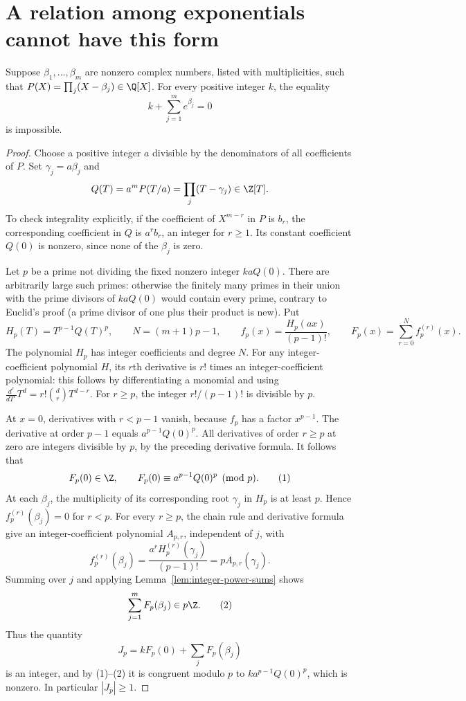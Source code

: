 \section{A relation among exponentials cannot have this form}
\begin{lemma}\label{lem:lindemann-special-relation}
Suppose $\beta_1,\ldots,\beta_m$ are nonzero complex numbers,
listed with multiplicities, such that
$P(X)=\prod_j(X-\beta_j)\in\Q[X]$. For every positive integer
$k$, the equality
\[
 k+\sum_{j=1}^m e^{\beta_j}=0
\]
is impossible.
\end{lemma}
\begin{proof}
Choose a positive integer $a$ divisible by the denominators of all
coefficients of $P$. Set $\gamma_j=a\beta_j$ and
\[
 Q(T)=a^mP(T/a)=\prod_j(T-\gamma_j)\in\Z[T].
\]
To check integrality explicitly, if the coefficient of $X^{m-r}$
in $P$ is $b_r$, the corresponding coefficient in $Q$ is $a^rb_r$,
an integer for $r\ge1$. Its constant coefficient $Q(0)$ is
nonzero, since none of the $\beta_j$ is zero.

Let $p$ be a prime not dividing the fixed nonzero integer
$kaQ(0)$. There are arbitrarily large such primes: otherwise the
finitely many primes in their union with the prime divisors of
$kaQ(0)$ would contain every prime, contrary to Euclid's proof
(a prime divisor of one plus their product is new). Put
\[
 H_p(T)=T^{p-1}Q(T)^p,\qquad N=(m+1)p-1,
 \qquad f_p(x)=\frac{H_p(ax)}{(p-1)!},\qquad
 F_p(x)=\sum_{r=0}^{N} f_p^{(r)}(x).
\]
The polynomial $H_p$ has integer coefficients and degree $N$.
For any integer-coefficient polynomial $H$, its $r$th derivative is
$r!$ times an integer-coefficient polynomial: this follows by
differentiating a monomial and using
$\frac{d^r}{dT^r}T^d=r!\binom dr T^{d-r}$.
For $r\ge p$, the integer $r!/(p-1)!$ is divisible by $p$.

At $x=0$, derivatives with $r<p-1$ vanish, because $f_p$ has a
factor $x^{p-1}$. The derivative at order $p-1$ equals
$a^{p-1}Q(0)^p$. All derivatives of order $r\ge p$ at zero are
integers divisible by $p$, by the preceding derivative formula.
It follows that
\[
 F_p(0)\in\Z,\qquad
 F_p(0)\equiv a^{p-1}Q(0)^p\pmod p.                 \tag{1}
\]
At each $\beta_j$, the multiplicity of its corresponding root
$\gamma_j$ in $H_p$ is at least $p$. Hence
$f_p^{(r)}(\beta_j)=0$ for $r<p$. For every $r\ge p$, the chain
rule and derivative formula give an integer-coefficient polynomial
$A_{p,r}$, independent of $j$, with
\[
 f_p^{(r)}(\beta_j)
   =\frac{a^rH_p^{(r)}(\gamma_j)}{(p-1)!}
   =p A_{p,r}(\gamma_j).
\]
Summing over $j$ and applying Lemma~\ref{lem:integer-power-sums}
shows
\[
 \sum_{j=1}^m F_p(\beta_j)\in p\Z.                \tag{2}
\]
Thus the quantity
\[
 J_p=kF_p(0)+\sum_jF_p(\beta_j)
\]
is an integer, and by (1)--(2) it is congruent modulo $p$ to
$ka^{p-1}Q(0)^p$, which is nonzero. In particular $|J_p|\ge1$.


\end{proof}
